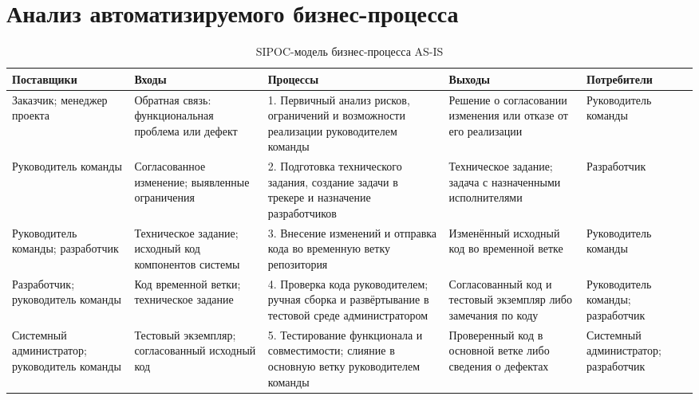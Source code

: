 \section{Анализ автоматизируемого бизнес-процесса}\label{sec:business-process-analysis}




\begin{landscape}
	\begin{table}[p]
		\centering
		\caption{SIPOC-модель бизнес-процесса AS-IS}\label{tab:sipoc-as-is}
		\footnotesize
		\setlength{\tabcolsep}{5pt}
		\renewcommand{\arraystretch}{1.15}
		\begin{tabularx}{\linewidth}{|Y{0.9}|Y{0.95}|Y{1.3}|Y{1.05}|Y{0.8}|}
			\hline
			\textbf{Поставщики} & \textbf{Входы} & \textbf{Процессы} & \textbf{Выходы} & \textbf{Потребители} \\
			\hline
			Заказчик; менеджер проекта &
			Обратная связь: функциональная проблема или дефект &
			1. Первичный анализ рисков, ограничений и возможности реализации руководителем команды &
			Решение о согласовании изменения или отказе от его реализации &
			Руководитель команды \\
			\hline
			Руководитель команды &
			Согласованное изменение; выявленные ограничения &
			2. Подготовка технического задания, создание задачи в трекере и назначение разработчиков &
			Техническое задание; задача с назначенными исполнителями &
			Разработчик \\
			\hline
			Руководитель команды; разработчик &
			Техническое задание; исходный код компонентов системы &
			3. Внесение изменений и отправка кода во временную ветку репозитория &
			Изменённый исходный код во временной ветке &
			Руководитель команды \\
			\hline
			Разработчик; руководитель команды &
			Код временной ветки; техническое задание &
			4. Проверка кода руководителем; ручная сборка и развёртывание в тестовой среде администратором &
			Согласованный код и тестовый экземпляр либо замечания по коду &
			Руководитель команды; разработчик \\
			\hline
			Системный администратор; руководитель команды &
			Тестовый экземпляр; согласованный исходный код &
			5. Тестирование функционала и совместимости; слияние в основную ветку руководителем команды &
			Проверенный код в основной ветке либо сведения о дефектах &
			Системный администратор; разработчик \\

\end{tabularx}
\end{table}
\end{landscape}
